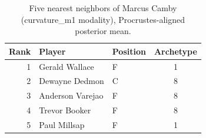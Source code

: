\begin{table}[htbp]
  \centering\small
  \begin{tabular}{rllc}
    \toprule
    Rank & Player & Position & Archetype \\
    \midrule
    1 & Gerald Wallace & F & 1 \\
    2 & Dewayne Dedmon & C & 8 \\
    3 & Anderson Varejao & F & 8 \\
    4 & Trevor Booker & F & 8 \\
    5 & Paul Millsap & F & 1 \\
    \bottomrule
  \end{tabular}
  \caption{Five nearest neighbors of Marcus Camby (curvature_m1 modality), Procrustes-aligned posterior mean.}
  \label{tab:Marcus_Camby_neighbors_curvature_m1}
\end{table}

